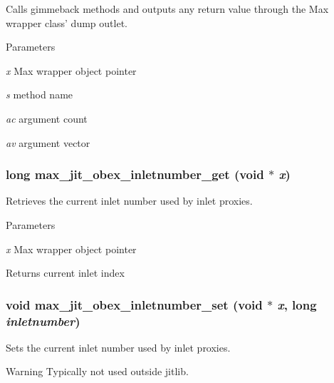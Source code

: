 Calls gimmeback methods and outputs any return value through the Max wrapper class' dump outlet. 
\begin{DoxyParams}{Parameters}
\item[{\em x}]Max wrapper object pointer \item[{\em s}]method name \item[{\em ac}]argument count \item[{\em av}]argument vector \end{DoxyParams}
\hypertarget{group__maxwrapmod_ga2c0d72889d3a89cbabe1001d55c86c3e}{
\subsubsection[{max\_\-jit\_\-obex\_\-inletnumber\_\-get}]{\setlength{\rightskip}{0pt plus 5cm}long max\_\-jit\_\-obex\_\-inletnumber\_\-get (void $\ast$ {\em x})}}
\label{group__maxwrapmod_ga2c0d72889d3a89cbabe1001d55c86c3e}


Retrieves the current inlet number used by inlet proxies. 
\begin{DoxyParams}{Parameters}
\item[{\em x}]Max wrapper object pointer\end{DoxyParams}
\begin{DoxyReturn}{Returns}
current inlet index 
\end{DoxyReturn}
\hypertarget{group__maxwrapmod_gad00618383afdeb1a45cf7cffd5ee6c9c}{
\subsubsection[{max\_\-jit\_\-obex\_\-inletnumber\_\-set}]{\setlength{\rightskip}{0pt plus 5cm}void max\_\-jit\_\-obex\_\-inletnumber\_\-set (void $\ast$ {\em x}, \/  long {\em inletnumber})}}
\label{group__maxwrapmod_gad00618383afdeb1a45cf7cffd5ee6c9c}


Sets the current inlet number used by inlet proxies. \begin{DoxyWarning}{Warning}
Typically not used outside jitlib.
\end{DoxyWarning}

